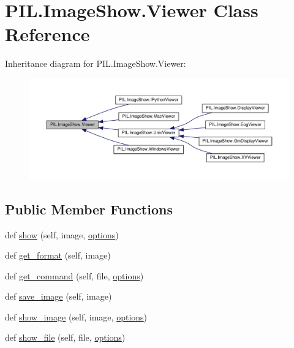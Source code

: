 \hypertarget{classPIL_1_1ImageShow_1_1Viewer}{}\section{P\+I\+L.\+Image\+Show.\+Viewer Class Reference}
\label{classPIL_1_1ImageShow_1_1Viewer}


Inheritance diagram for P\+I\+L.\+Image\+Show.\+Viewer\+:
\nopagebreak
\begin{figure}[H]
\begin{center}
\leavevmode
\includegraphics[width=350pt]{classPIL_1_1ImageShow_1_1Viewer__inherit__graph}
\end{center}
\end{figure}
\subsection*{Public Member Functions}
\begin{DoxyCompactItemize}
\item 
def \hyperlink{classPIL_1_1ImageShow_1_1Viewer_a41a13880da52d51728c1310d4820a6cd}{show} (self, image, \hyperlink{classPIL_1_1ImageShow_1_1Viewer_acb3726be586129f8100b5f57cd61bf97}{options})
\item 
def \hyperlink{classPIL_1_1ImageShow_1_1Viewer_a0585450f79b17f3f8cffec7d4d03f2aa}{get\+\_\+format} (self, image)
\item 
def \hyperlink{classPIL_1_1ImageShow_1_1Viewer_aac88a368669e21d3e8b0ce2993407752}{get\+\_\+command} (self, file, \hyperlink{classPIL_1_1ImageShow_1_1Viewer_acb3726be586129f8100b5f57cd61bf97}{options})
\item 
def \hyperlink{classPIL_1_1ImageShow_1_1Viewer_aad5e9724c2b373048c41ff41cf4942fb}{save\+\_\+image} (self, image)
\item 
def \hyperlink{classPIL_1_1ImageShow_1_1Viewer_aaec00878ea8a80a72f55cb317d9c8b4c}{show\+\_\+image} (self, image, \hyperlink{classPIL_1_1ImageShow_1_1Viewer_acb3726be586129f8100b5f57cd61bf97}{options})
\item 
def \hyperlink{classPIL_1_1ImageShow_1_1Viewer_ab19f8dc5c77a5172b5a416887e3e8bcc}{show\+\_\+file} (self, file, \hyperlink{classPIL_1_1ImageShow_1_1Viewer_acb3726be586129f8100b5f57cd61bf97}{options})
\end{DoxyCompactItemize}
